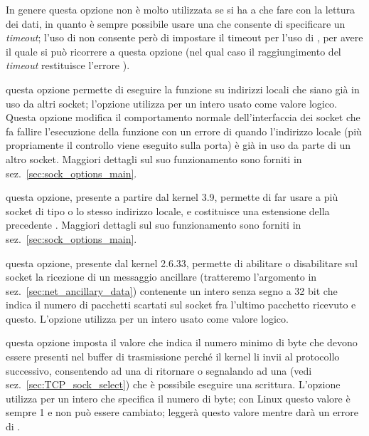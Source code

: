 \begin{basedescript}{\desclabelwidth{2.2cm}\desclabelstyle{\nextlinelabel}}
  In genere questa opzione non è molto utilizzata se si ha a che fare con la
  lettura dei dati, in quanto è sempre possibile usare una  che
  consente di specificare un \textit{timeout}; l'uso di  non
  consente però di impostare il timeout per l'uso di , per avere
  il quale si può ricorrere a questa opzione (nel qual caso il raggiungimento
  del \textit{timeout} restituisce l'errore ). 

\item[\const{SO\_REUSEADDR}] questa opzione permette di eseguire la funzione
   su indirizzi locali che siano già in uso da altri socket;
  l'opzione utilizza per  un intero usato come valore logico.
  Questa opzione modifica il comportamento normale dell'interfaccia dei socket
  che fa fallire l'esecuzione della funzione  con un errore di
   quando l'indirizzo locale (più propriamente il
  controllo viene eseguito sulla porta) è già in uso da parte di un altro
  socket.  Maggiori dettagli sul suo funzionamento sono forniti in
  sez.~\ref{sec:sock_options_main}.

\item[\const{SO\_REUSEPORT}] questa opzione, presente a partire dal kernel
  3.9, permette di far usare a più socket di tipo  o
   lo stesso indirizzo locale, e costituisce una estensione
  della precedente .  Maggiori dettagli sul suo
  funzionamento sono forniti in sez.~\ref{sec:sock_options_main}.

\item[\constd{SO\_RXQ\_OVFL}] questa opzione, presente dal kernel 2.6.33,
  permette di abilitare o disabilitare sul socket la ricezione di un messaggio
  ancillare (tratteremo l'argomento in sez.~\ref{sec:net_ancillary_data})
  contenente un intero senza segno a 32 bit che indica il numero di pacchetti
  scartati sul socket fra l'ultimo pacchetto ricevuto e questo.  L'opzione
  utilizza per  un intero usato come valore logico.


\item[\constd{SO\_SNDLOWAT}] questa opzione imposta il valore che indica il
  numero minimo di byte che devono essere presenti nel buffer di trasmissione
  perché il kernel li invii al protocollo successivo, consentendo ad una
   di ritornare o segnalando ad una  (vedi
  sez.~\ref{sec:TCP_sock_select}) che è possibile eseguire una scrittura.
  L'opzione utilizza per  un intero che specifica il numero di
  byte; con Linux questo valore è sempre 1 e non può essere cambiato;
   leggerà questo valore mentre  darà un
  errore di .


\end{basedescript}
